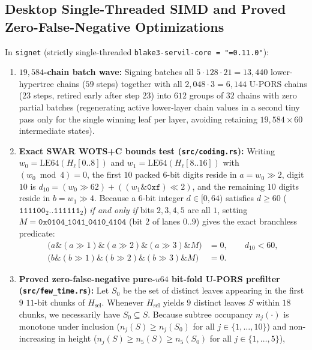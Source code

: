 \documentclass[11pt,a4paper]{article}
\theoremstyle{definition}
\theoremstyle{remark}
\newcommand{\WOTSC}{\textsf{WOTS+C}}
\newcommand{\UPORS}{\textsf{U-PORS}}
\begin{document}
\subsection{Desktop Single-Threaded SIMD and Proved Zero-False-Negative Optimizations}
In \texttt{signet} (strictly single-threaded \texttt{blake3-servil-core = "=0.11.0"}):
\begin{enumerate}[leftmargin=1.4em,itemsep=2pt]
  \item \textbf{$19{,}584$-chain batch wave:} Signing batches all $5 \cdot 128 \cdot 21 = 13{,}440$ lower-hypertree chains ($59$ steps) together with all $2{,}048 \cdot 3 = 6{,}144$ \UPORS{} chains ($23$ steps, retired early after step $23$) into $612$ groups of $32$ chains with zero partial batches (regenerating active lower-layer chain values in a second tiny pass only for the single winning leaf per layer, avoiding retaining $19{,}584 \times 60$ intermediate states).
  \item \textbf{Exact SWAR \WOTSC{} bounds test (\texttt{src/coding.rs}):} Writing $w_0 = \mathrm{LE64}(H_\ell[0..8])$ and $w_1 = \mathrm{LE64}(H_\ell[8..16])$ with $(w_0 \bmod 4) = 0$, the first $10$ packed $6$-bit digits reside in $a = w_0 \gg 2$, digit $10$ is $d_{10} = (w_0 \gg 62) + ((w_1 \mathbin{\&} \mathtt{0xf}) \ll 2)$, and the remaining $10$ digits reside in $b = w_1 \gg 4$. Because a $6$-bit integer $d \in [0, 64)$ satisfies $d \ge 60$ ($\mathtt{111100}_2..\mathtt{111111}_2$) \emph{if and only if} bits $2,3,4,5$ are all $1$, setting $M = \mathtt{0x0104\_1041\_0410\_4104}$ (bit $2$ of lanes $0..9$) gives the exact branchless predicate:
    \begin{align*}
      \big(a \mathbin{\&} (a \gg 1) \mathbin{\&} (a \gg 2) \mathbin{\&} (a \gg 3) \mathbin{\&} M\big) &= 0, \qquad d_{10} < 60, \\
      \big(b \mathbin{\&} (b \gg 1) \mathbin{\&} (b \gg 2) \mathbin{\&} (b \gg 3) \mathbin{\&} M\big) &= 0.
    \end{align*}
  \item \textbf{Proved zero-false-negative pure-$u64$ bit-fold \UPORS{} prefilter (\texttt{src/few\_time.rs}):} Let $S_0$ be the set of distinct leaves appearing in the first $9$ $11$-bit chunks of $H_{\mathrm{sel}}$. Whenever $H_{\mathrm{sel}}$ yields $9$ distinct leaves $S$ within $18$ chunks, we necessarily have $S_0 \subseteq S$. Because subtree occupancy $n_j(\cdot)$ is monotone under inclusion ($n_j(S) \ge n_j(S_0)$ for all $j \in \{1,\dots,10\}$) and non-increasing in height ($n_j(S) \ge n_5(S) \ge n_5(S_0)$ for all $j \in \{1,\dots,5\}$),

\end{enumerate}
\end{document}
